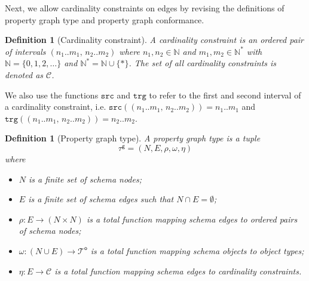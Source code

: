 \documentclass[a4paper]{article}
\newtheorem{definition}[theorem]{Definition}
\newcommand{\N}{\mathbb{N}}
\newcommand{\src}{\mathtt{src}}
\newcommand{\trg}{\mathtt{trg}}
\newcommand{\otypes}{\mathcal{T}^\mathsf{o}}
\newcommand{\gtype}{\tau^\mathsf{g}}
\begin{document}
Next, we allow cardinality constraints on edges by revising the definitions of property graph type and property graph conformance.

\begin{definition}[Cardinality constraint]
  A \emph{cardinality constraint} is an ordered pair of intervals $(n_1..m_1, \, n_2..m_2)$ where $n_1, n_2 \in \N$ and $m_1, m_2 \in \N^*$ with $\N = \{0, 1, 2, \ldots\}$ and $\N^* = \N \cup \{*\}$. The set of all cardinality constraints is denoted as $\mathcal{C}$.
\end{definition}

We also use the functions $\src$ and $\trg$ to refer to the first and second interval of a cardinality constraint, i.e. $\src((n_1..m_1, \, n_2..m_2)) = n_1..m_1$ and $\trg((n_1..m_1, \, n_2..m_2)) = n_2..m_2$.

\begin{definition}[Property graph type]
  A \emph{property graph type} is a tuple $$\gtype = (N, E, \rho, \omega, \eta)$$ where
  \begin{itemize}
    \item $N$ is a finite set of schema nodes;
    \item $E$ is a finite set of schema edges such that $N \cap E = \emptyset$;
    \item $\rho : E \to (N \times N)$ is a total function mapping schema edges to ordered pairs of schema nodes;
    \item $\omega : (N \cup E) \to \otypes$ is a total function mapping schema objects to object types;
    \item $\eta : E \to \mathcal{C}$ is a total function mapping schema edges to cardinality constraints.
  \end{itemize}
\end{definition}
\end{document}
